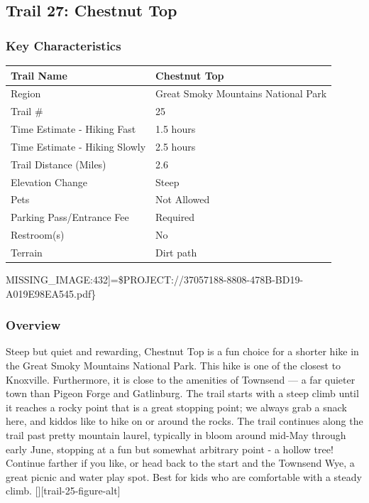 \documentclass[
  letterpaper,
  DIV=11,
  numbers=noendperiod]{scrartcl}
\begin{document}
\hypertarget{trail-27-chestnut-top}{%
\subsection{Trail 27: Chestnut Top}\label{trail-27-chestnut-top}}

\hypertarget{key-characteristics-26}{%
\subsubsection{Key Characteristics}\label{key-characteristics-26}}

\begin{longtable}[]{@{}ll@{}}
\toprule\noalign{}
Trail Name & Chestnut Top \\
\midrule\noalign{}
\endhead
\bottomrule\noalign{}
\endlastfoot
Region & Great Smoky Mountains National Park \\
Trail \# & 25 \\
Time Estimate - Hiking Fast & 1.5 hours \\
Time Estimate - Hiking Slowly & 2.5 hours \\
Trail Distance (Miles) & 2.6 \\
Elevation Change & Steep \\
Pets & Not Allowed \\
Parking Pass/Entrance Fee & Required \\
Restroom(s) & No \\
Terrain & Dirt path \\
\end{longtable}

MISSING\_IMAGE:432{]}=\$PROJECT://37057188-8808-478B-BD19-A019E98EA545.pdf\}

\hypertarget{overview-26}{%
\subsubsection{Overview}\label{overview-26}}

Steep but quiet and rewarding, Chestnut Top is a fun choice for a
shorter hike in the Great Smoky Mountains National Park. This hike is
one of the closest to Knoxville. Furthermore, it is close to the
amenities of Townsend --- a far quieter town than Pigeon Forge and
Gatlinburg. The trail starts with a steep climb until it reaches a rocky
point that is a great stopping point; we always grab a snack here, and
kiddos like to hike on or around the rocks. The trail continues along
the trail past pretty mountain laurel, typically in bloom around mid-May
through early June, stopping at a fun but somewhat arbitrary point - a
hollow tree! Continue farther if you like, or head back to the start and
the Townsend Wye, a great picnic and water play spot. Best for kids who
are comfortable with a steady climb. {[}{]}{[}trail-25-figure-alt{]}
\end{document}

